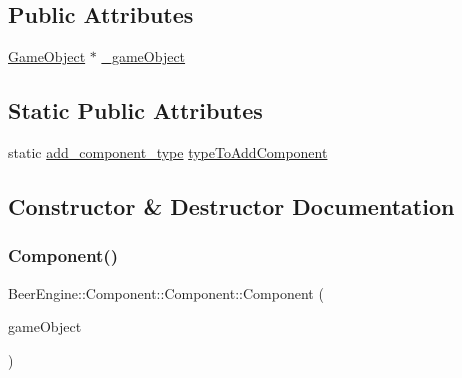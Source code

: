 \subsection*{Public Attributes}
\begin{DoxyCompactItemize}
\item 
\mbox{\hyperlink{class_beer_engine_1_1_game_object}{Game\+Object}} $\ast$ \mbox{\hyperlink{class_beer_engine_1_1_component_1_1_component_a509b665dde3d7b2ff3163ad61c26e0de}{\+\_\+game\+Object}}
\end{DoxyCompactItemize}
\subsection*{Static Public Attributes}
\begin{DoxyCompactItemize}
\item 
static \mbox{\hyperlink{namespace_beer_engine_1_1_component_a58109916ff3e951c90c1dcd5ebba359b}{add\+\_\+component\+\_\+type}} \mbox{\hyperlink{class_beer_engine_1_1_component_1_1_component_ae2a965d0f01f9bca16e5159f00a4f76e}{type\+To\+Add\+Component}}
\end{DoxyCompactItemize}


\subsection{Constructor \& Destructor Documentation}
\mbox{\label{class_beer_engine_1_1_component_1_1_component_ac8c3bb83023f324a8dbf63980a08a5cc}} 
\subsubsection{\texorpdfstring{Component()}{Component()}}
{\footnotesize\ttfamily Beer\+Engine\+::\+Component\+::\+Component\+::\+Component (\begin{DoxyParamCaption}\item[{\mbox{\hyperlink{class_beer_engine_1_1_game_object}{Game\+Object}} $\ast$}]{game\+Object }\end{DoxyParamCaption})}

\mbox{\label{class_beer_engine_1_1_component_1_1_component_a1688651a7403f4ff4587185df0b1e8ed}} 
